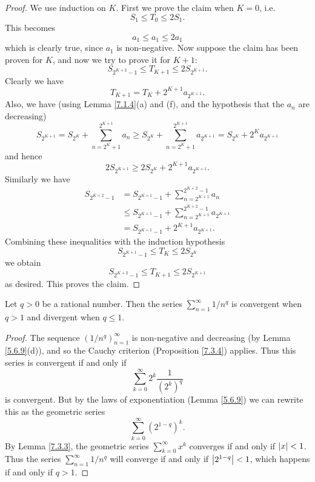 \begin{proof}
We use induction on \(K\).
First we prove the claim when \(K = 0\), i.e.
\[
    S_1 \leq T_0 \leq 2S_1.
\]
This becomes
\[
    a_1 \leq a_1 \leq 2a_1
\]
which is clearly true, since \(a_1\) is non-negative.
Now suppose the claim has been proven for \(K\), and now we try to prove it for \(K + 1\):
\[
    S_{2^{K + 2} - 1} \leq T_{K + 1} \leq 2S_{2^{K + 1}}.
\]
Clearly we have
\[
    T_{K + 1} = T_K + 2^{K + 1} a_{2^{K + 1}}.
\]
Also, we have
(using Lemma \ref{7.1.4}(a) and (f), and the hypothesis that the \(a_n\) are decreasing)
\[
    S_{2^{K + 1}} = S_{2^K} + \sum_{n = 2^K + 1}^{2^{K + 1}} a_n \geq S_{2^K} + \sum_{n = 2^K + 1}^{2^{K + 1}} a_{2^{K + 1}} = S_{2^K} + 2^K a_{2^{K + 1}}
\]
and hence
\[
    2S_{2^{K + 1}} \geq 2S_{2^K} + 2^{K + 1} a_{2^{K + 1}}.
\]
Similarly we have
\begin{align*}
S_{2^{K + 2} - 1} &= S_{2^{K + 1} - 1} + \sum_{n = 2^{K + 1}}^{2^{K + 2} - 1} a_n \\
&\leq S_{2^{K + 1} - 1} + \sum_{n = 2^{K + 1}}^{2^{K + 2} - 1} a_{2^{K + 1}} \\
&= S_{2^{K + 1} - 1} + 2^{K + 1} a_{2^{K + 1}}.
\end{align*}
Combining these inequalities with the induction hypothesis
\[
    S_{2^{K + 1} - 1} \leq T_K \leq 2S_{2^K}
\]
we obtain
\[
    S_{2^{K + 2} - 1} \leq T_{K + 1} \leq 2S_{2^{K + 1}}
\]
as desired.
This proves the claim.
\end{proof}

\begin{corollary}\label{7.3.7}
Let \(q > 0\) be a rational number.
Then the series \(\sum_{n = 1}^\infty 1 / n^q\) is convergent when \(q > 1\) and divergent when \(q \leq 1\).
\end{corollary}

\begin{proof}
The sequence \((1 / n^q)_{n = 1}^\infty\) is non-negative and decreasing (by Lemma \ref{5.6.9}(d)), and so the Cauchy criterion (Proposition \ref{7.3.4}) applies.
Thus this series is convergent if and only if
\[
    \sum_{k = 0}^\infty 2^k \frac{1}{(2^k)^q}
\]
is convergent.
But by the laws of exponentiation (Lemma \ref{5.6.9}) we can rewrite this as the geometric series
\[
    \sum_{k = 0}^\infty (2^{1 - q})^k.
\]
By Lemma \ref{7.3.3}, the geometric series \(\sum_{k = 0}^\infty x^k\) converges if and only if \(\abs*{x} < 1\).
Thus the series \(\sum_{n = 1}^\infty 1 / n^q\) will converge if and only if \(\abs*{2^{1 - q}} < 1\), which happens if and only if \(q > 1\).
\end{proof}

